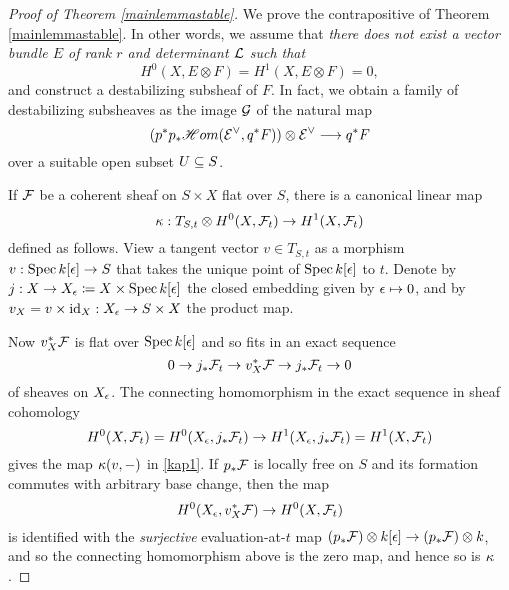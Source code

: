 \documentclass[letterpaper,12pt]{amsart}
\theoremstyle{remark}
\begin{document}
\begin{proof}[Proof of Theorem \ref{mainlemmastable}]
We prove the contrapositive of Theorem \ref{mainlemmastable}. In other words, we assume that \emph{there does not exist a vector bundle $E$ of rank $r$ and determinant $\mathcal{L}$ such that} 
\[ H^0(X, E \otimes F) = H^1(X, E \otimes F) = 0, \]
and construct a destabilizing subsheaf of $F$. In fact, we obtain a family of destabilizing subsheaves as the image $\mathcal{G}$ of the natural map
\[ \left(p^* p_*\mathscr{H}om(\mathcal{E}^\vee, q^*F)\right) \otimes \mathcal{E}^\vee  \longrightarrow q^*F \]
over a suitable open subset $U \subseteq S$.

If $\mathcal{F}$ be a coherent sheaf on $S \times X$ flat over $S$, there is a canonical linear map
\begin{equation}\label{kap1}
    \kappa: T_{S,t} \otimes H^0(X, \mathcal{F}_t) \to H^1(X, \mathcal{F}_t)
\end{equation}
defined as follows. View a tangent vector $v \in T_{S,t}$ as a morphism $v: \operatorname{\mathrm{Spec}} k[\epsilon] \to S$ that takes the unique point of $\operatorname{\mathrm{Spec}} k[\epsilon]$ to $t$. Denote by $j: X \to X_\epsilon \coloneqq X \times \operatorname{\mathrm{Spec}} k[\epsilon]$ the closed embedding given by $\epsilon \mapsto 0$, and by $v_X = v \times \mathrm{id}_X: X_\epsilon \to S\times X$ the product map.
\begin{center}
\end{center}
Now $v_X^*\mathcal{F}$ is flat over $\operatorname{\mathrm{Spec}} k[\epsilon]$ and so fits in an exact sequence
\[ 0 \to j_* \mathcal{F}_t \to v_X^*\mathcal{F} \to j_* \mathcal{F}_t \to 0 \]
of sheaves on $X_\epsilon$. The connecting homomorphism in the exact sequence in sheaf cohomology
\[ H^0(X, \mathcal{F}_t) = H^0(X_\epsilon, j_*\mathcal{F}_t) \to H^1(X_\epsilon, j_*\mathcal{F}_t) = H^1(X, \mathcal{F}_t) \]
gives the map $\kappa(v, -)$ in \eqref{kap1}. If $p_*\mathcal{F}$ is locally free on $S$ and its formation commutes with arbitrary base change, then the map
\[ H^0(X_\epsilon, v_X^*\mathcal{F}) \to H^0(X, \mathcal{F}_t) \]
is identified with the \emph{surjective} evaluation-at-$t$ map $(p_*\mathcal{F}) \otimes k[\epsilon] \to (p_* \mathcal{F}) \otimes k$, and so the connecting homomorphism above is the zero map, and hence so is $\kappa$. 


\end{proof}
\end{document}

